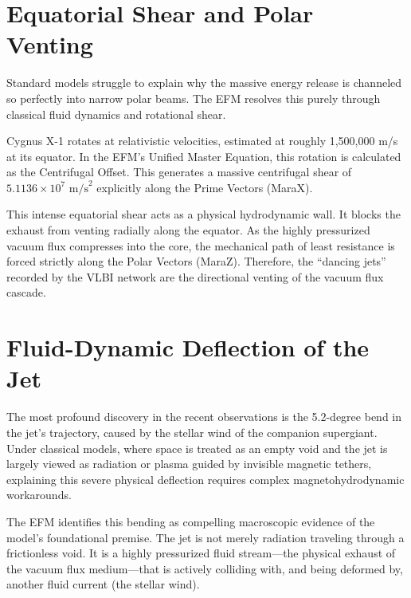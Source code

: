 \documentclass[11pt, a4paper]{article}
\begin{document}
\section{Equatorial Shear and Polar Venting}
Standard models struggle to explain why the massive energy release is channeled so perfectly into narrow polar beams. The EFM resolves this purely through classical fluid dynamics and rotational shear.

Cygnus X-1 rotates at relativistic velocities, estimated at roughly 1,500,000 m/s at its equator. In the EFM's Unified Master Equation, this rotation is calculated as the Centrifugal Offset. This generates a massive centrifugal shear of $5.1136 \times 10^7 \text{ m/s}^2$ explicitly along the Prime Vectors (MaraX).

This intense equatorial shear acts as a physical hydrodynamic wall. It blocks the exhaust from venting radially along the equator. As the highly pressurized vacuum flux compresses into the core, the mechanical path of least resistance is forced strictly along the Polar Vectors (MaraZ). Therefore, the ``dancing jets'' recorded by the VLBI network are the directional venting of the vacuum flux cascade.

\section{Fluid-Dynamic Deflection of the Jet}
The most profound discovery in the recent observations is the 5.2-degree bend in the jet's trajectory, caused by the stellar wind of the companion supergiant. Under classical models, where space is treated as an empty void and the jet is largely viewed as radiation or plasma guided by invisible magnetic tethers, explaining this severe physical deflection requires complex magnetohydrodynamic workarounds.

The EFM identifies this bending as compelling macroscopic evidence of the model's foundational premise. The jet is not merely radiation traveling through a frictionless void. It is a highly pressurized fluid stream---the physical exhaust of the vacuum flux medium---that is actively colliding with, and being deformed by, another fluid current (the stellar wind). 
\end{document}
